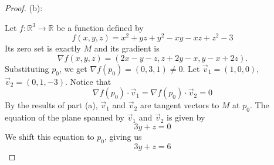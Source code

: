 \documentclass{article}
\theoremstyle{plain} %
\numberwithin{thm}{section} %
\theoremstyle{definition}
\begin{document}
\begin{proof}
        \medskip

        \noindent(b):

        Let \(f: \mathbb{R}^3 \to \mathbb{R}\) be a function defined by
        \[
            f(x,y,z) = x^2 + yz + y^2 - xy -xz + z^2 - 3
        \]
        Its zero set is exactly \(M\) and its gradient is
        \[
            \nabla f(x,y,z) = (2x - y - z, z + 2y - x, y - x + 2z).
        \]
        Substituting \(p_0\), we get \(\nabla f(p_0) = (0, 3, 1) \neq 0\). Let \(\vec{v}_1 = (1, 0, 0)\), \(\vec{v}_2 = (0, 1, -3)\). Notice that
        \[
            \nabla f(p_0) \cdot \vec{v}_1 = \nabla f(p_0) \cdot \vec{v}_2 = 0
        \]
        By the results of part (a), \(\vec{v}_1\) and \(\vec{v}_2\) are tangent vectors to \(M\) at \(p_0\). The equation of the plane spanned by \(\vec{v}_1\) and \(\vec{v}_2\) is given by
        \[
            3y + z = 0
        \]
        We shift this equation to \(p_0\), giving us
        \[
            3y + z = 6
        \]
        \end{proof}
        \newpage
\end{document}

